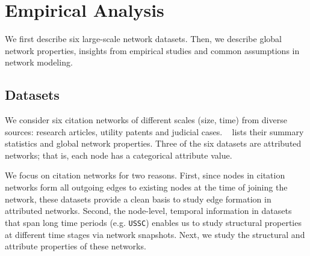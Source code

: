 
\section{Empirical Analysis}
\label{sec:Analysis}

We first describe six large-scale network datasets.
Then, we describe global network properties,
insights from empirical studies and common assumptions in
network modeling.

\subsection{Datasets}
\label{sec:Datasets}

We consider six citation networks of different scales (size, time) from diverse
sources: research articles, utility patents and judicial cases. ~ lists their
summary statistics and global network properties.  Three of the six datasets are attributed networks;
that is, each node has a categorical attribute value.

We focus on citation networks for two reasons. First, since nodes in citation networks form
all outgoing edges to existing nodes at the time of joining the network,
these datasets provide a clean basis to study edge formation in
attributed networks. Second, the node-level, temporal information in datasets that span long time periods (e.g. \texttt{USSC})
enables us to study structural properties at different time stages via network snapshots.
Next, we study the structural and attribute properties of these networks.

